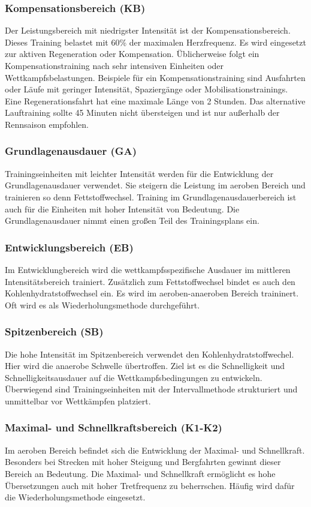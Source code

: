 \subsubsection{Kompensationsbereich (KB)}
Der Leistungsbereich mit niedrigster Intensität ist der Kompensationsbereich. Dieses Training belastet mit 60\% der maximalen Herzfrequenz. Es wird eingesetzt zur aktiven Regeneration oder Kompensation. Üblicherweise folgt ein Kompensationstraining nach sehr intensiven Einheiten oder Wettkampfsbelastungen. Beispiele für ein Kompensationstraining sind Ausfahrten oder Läufe mit geringer Intensität, Spaziergänge oder Mobilisationstrainings. \cite[31-32]{Radsporttraining}
Eine Regenerationsfahrt hat eine maximale Länge von 2 Stunden. Das alternative Lauftraining sollte 45 Minuten nicht übersteigen und ist nur außerhalb der Rennsaison empfohlen.
\subsubsection{Grundlagenausdauer (GA)}
Trainingseinheiten mit leichter Intensität werden für die Entwicklung der Grundlagenausdauer verwendet. Sie steigern die Leistung im aeroben Bereich und trainieren so denn Fettstoffwechsel. 
Training im Grundlagenausdauerbereich ist auch für die Einheiten mit hoher Intensität von Bedeutung. Die Grundlagenausdauer nimmt einen großen Teil des Trainingsplans ein.
\subsubsection{Entwicklungsbereich (EB)}
Im Entwicklungbereich wird die wettkampfsspezifische Ausdauer im mittleren Intensitätsbereich trainiert. Zusätzlich zum Fettstoffwechsel bindet es auch den Kohlenhydratstoffwechsel ein. Es wird im aeroben-anaeroben Bereich traininert. Oft wird es als Wiederholungsmethode durchgeführt.
\subsubsection{Spitzenbereich (SB)}
Die hohe Intensität im Spitzenbereich verwendet den Kohlenhydratstoffwechel. Hier wird die anaerobe Schwelle übertroffen. Ziel ist es die Schnelligkeit und Schnelligkeitsausdauer auf die Wettkampfsbedingungen zu entwickeln. Überwiegend sind Trainingseinheiten mit der Intervallmethode strukturiert und unmittelbar vor Wettkämpfen platziert.
\subsubsection{Maximal- und Schnellkraftsbereich (K1-K2)}
Im aeroben Bereich befindet sich die Entwicklung der Maximal- und Schnellkraft. Besonders bei Strecken mit hoher Steigung und Bergfahrten gewinnt dieser Bereich an Bedeutung. Die Maximal- und Schnellkraft ermöglicht es hohe Übersetzungen auch mit hoher Tretfrequenz zu beherrschen. Häufig wird dafür die Wiederholungsmethode eingesetzt.
